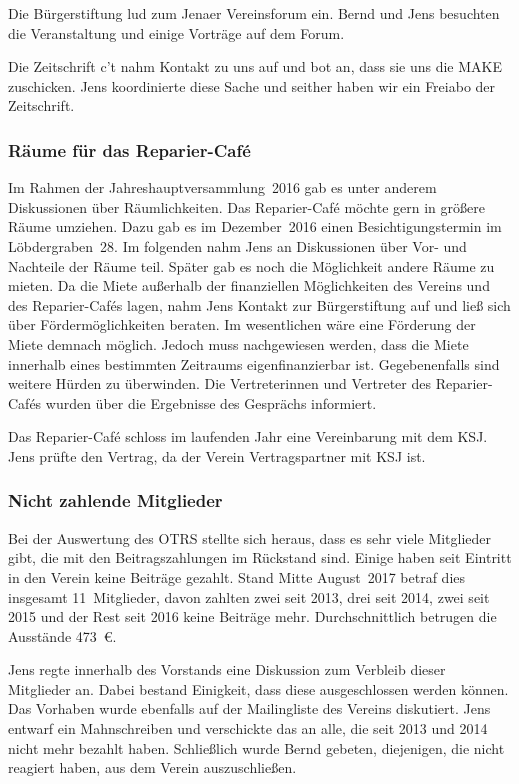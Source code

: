 \documentclass[ngerman]{scrartcl}
\begin{document}
Die Bürgerstiftung lud zum Jenaer Vereinsforum ein. Bernd und Jens besuchten die
Veranstaltung und einige Vorträge auf dem Forum.

Die Zeitschrift c't nahm Kontakt zu uns auf und bot an, dass sie uns die MAKE
zuschicken. Jens koordinierte diese Sache und seither haben wir ein Freiabo der
Zeitschrift.


\subsubsection{Räume für das Reparier-Café}
\label{sec:raumrc}

Im Rahmen der Jahreshauptversammlung~2016 gab es unter anderem Diskussionen über
Räumlichkeiten. Das Reparier-Café möchte gern in größere Räume umziehen. Dazu
gab es im Dezember~2016 einen Besichtigungstermin im Löbdergraben~28. Im
folgenden nahm Jens an Diskussionen über Vor- und Nachteile der Räume
teil. Später gab es noch die Möglichkeit andere Räume zu mieten. Da die Miete
außerhalb der finanziellen Möglichkeiten des Vereins und des Reparier-Cafés
lagen, nahm Jens Kontakt zur Bürgerstiftung auf und ließ sich über
Fördermöglichkeiten beraten. Im wesentlichen wäre eine Förderung der Miete
demnach möglich. Jedoch muss nachgewiesen werden, dass die Miete innerhalb eines
bestimmten Zeitraums eigenfinanzierbar ist. Gegebenenfalls sind weitere Hürden
zu überwinden. Die Vertreterinnen und Vertreter des Reparier-Cafés wurden über
die Ergebnisse des Gesprächs informiert.

Das Reparier-Café schloss im laufenden Jahr eine Vereinbarung mit dem KSJ. Jens
prüfte den Vertrag, da der Verein Vertragspartner mit KSJ ist. 

\subsubsection{Nicht zahlende Mitglieder}

Bei der Auswertung des OTRS stellte sich heraus, dass es sehr viele Mitglieder
gibt, die mit den Beitragszahlungen im Rückstand sind. Einige haben seit
Eintritt in den Verein keine Beiträge gezahlt. Stand Mitte August~2017 betraf
dies insgesamt 11~Mitglieder, davon zahlten zwei seit 2013, drei seit 2014, zwei
seit 2015 und der Rest seit 2016 keine Beiträge mehr. Durchschnittlich betrugen
die Ausstände \num{473}~\euro{}.

Jens regte innerhalb des
Vorstands eine Diskussion zum Verbleib dieser Mitglieder an. Dabei bestand
Einigkeit, dass diese ausgeschlossen werden können. Das Vorhaben wurde ebenfalls
auf der Mailingliste des Vereins diskutiert. Jens entwarf ein Mahnschreiben und
verschickte das an alle, die seit 2013 und 2014 nicht mehr bezahlt
haben. Schließlich wurde Bernd gebeten, diejenigen, die nicht reagiert haben,
aus dem Verein auszuschließen.
\end{document}
